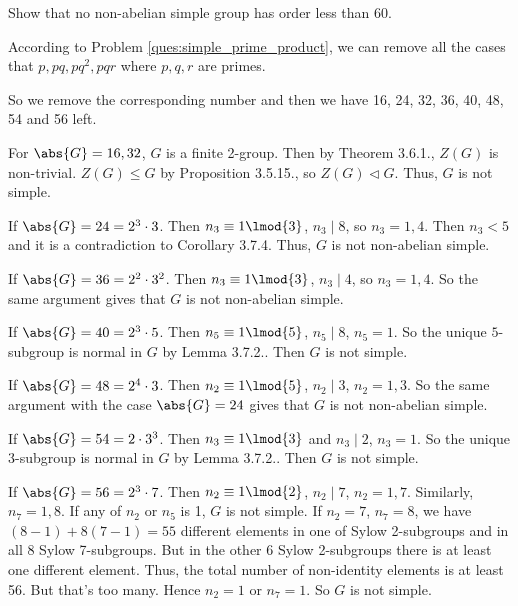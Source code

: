 


\begin{problem}
Show that no non-abelian simple group has order less than 60.
\end{problem}

\begin{solution}[\bf Solution.]
According to Problem \ref{ques:simple_prime_product}, we can remove all the cases that $p,pq,pq^2,pqr$ where $p,q,r$ are primes.

So we remove the corresponding number and then we have 16, 24, 32, 36, 40, 48, 54 and 56 left.

For $\abs{G} = 16,32$, $G$ is a finite 2-group. Then by Theorem 3.6.1., $Z(G)$ is non-trivial. $Z(G) \leq G$ by Proposition 3.5.15., so $Z(G) \lhd G$. Thus, $G$ is not simple.

If $\abs{G} = 24 = 2^3 \cdot 3$. Then $n_3 \equiv 1 \lmod{3}$, $n_3\mid 8$, so $n_3 = 1,4$. Then $n_3 < 5$ and it is a contradiction to Corollary 3.7.4. Thus, $G$ is not non-abelian simple.

If $\abs{G} = 36 = 2^2 \cdot 3^2$. Then $n_3 \equiv 1 \lmod{3}$, $n_3\mid 4$, so $n_3=1,4$. So the same argument gives that $G$ is not non-abelian simple.

If $\abs{G} = 40 = 2^3 \cdot 5$. Then $n_5\equiv 1\lmod{5}$, $n_5 \mid 8$, $n_5 = 1$. So the unique $5$-subgroup is normal in $G$ by Lemma 3.7.2.. Then $G$ is not simple.

If $\abs{G} = 48 = 2^4 \cdot 3$. Then $n_2 \equiv 1 \lmod{5}$, $n_2 \mid 3$, $n_2 = 1,3$. So the same argument with the case $\abs{G} = 24$ gives that $G$ is not non-abelian simple.

If $\abs{G} = 54 = 2\cdot 3^3$. Then $n_3 \equiv 1\lmod{3}$ and $n_3 \mid 2$, $n_3 = 1$. So the unique $3$-subgroup is normal in $G$ by Lemma 3.7.2.. Then $G$ is not simple.

If $\abs{G} = 56 = 2^3 \cdot 7$. Then $n_2\equiv 1\lmod{2}$, $n_2 \mid 7$, $n_2 = 1,7$. Similarly, $n_7 = 1,8$. If any of $n_2$ or $n_5$ is 1, $G$ is not simple. If $n_2 = 7$, $n_7 = 8$, we have $(8-1) + 8(7-1) = 55$ different elements in one of Sylow 2-subgroups and in all 8 Sylow 7-subgroups. But in the other 6 Sylow 2-subgroups there is at least one different element. Thus, the total number of non-identity elements is at least 56. But that's too many. Hence $n_2 = 1$ or $n_7 = 1$. So $G$ is not simple.
\end{solution}

